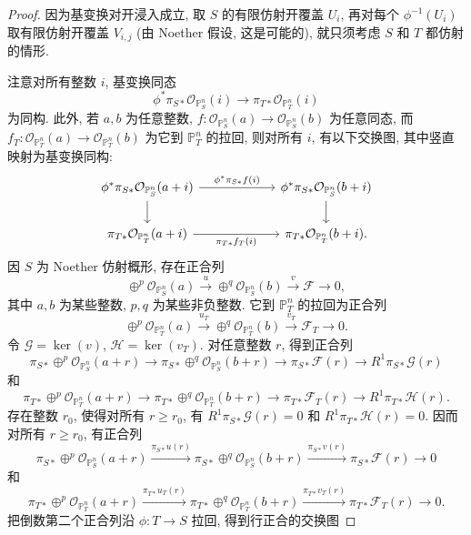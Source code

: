 \begin{proof}
因为基变换对开浸入成立, 取 $S$ 的有限仿射开覆盖 $U_i$, 再对每个 $\phi^{-1}(U_i)$ 取有限仿射开覆盖 $V_{i,j}$ (由 Noether 假设, 这是可能的), 就只须考虑 $S$ 和 $T$ 都仿射的情形.

注意对所有整数 $i$, 基变换同态
\[
 \phi^*\pi_{S*}\mathcal O_{\mathbb P^n_S}(i)\longrightarrow\pi_{T*}\mathcal O_{\mathbb P^n_T}(i)
\]
为同构. 此外, 若 $a,b$ 为任意整数, $f:\mathcal O_{\mathbb P^n_S}(a)\to\mathcal O_{\mathbb P^n_S}(b)$ 为任意同态, 而 $f_T:\mathcal O_{\mathbb P^n_T}(a)\to\mathcal O_{\mathbb P^n_T}(b)$ 为它到 $\mathbb P^n_T$ 的拉回, 则对所有 $i$, 有以下交换图, 其中竖直映射为基变换同构:
\[
\begin{tikzcd}[column sep=6em]
\phi^*\pi_{S*}\mathcal O_{\mathbb P^n_S}(a+i)\arrow[r,"\phi^*\pi_{S*}f(i)"]\arrow[d]
 &\phi^*\pi_{S*}\mathcal O_{\mathbb P^n_S}(b+i)\arrow[d]\\
\pi_{T*}\mathcal O_{\mathbb P^n_T}(a+i)\arrow[r,"\pi_{T*}f_T(i)"']
 &\pi_{T*}\mathcal O_{\mathbb P^n_T}(b+i).
\end{tikzcd}
\]
因 $S$ 为 Noether 仿射概形, 存在正合列
\[
 \oplus^p\mathcal O_{\mathbb P^n_S}(a)\xrightarrow{u}
 \oplus^q\mathcal O_{\mathbb P^n_S}(b)\xrightarrow{v}\mathcal F\longrightarrow0,
\]
其中 $a,b$ 为某些整数, $p,q$ 为某些非负整数. 它到 $\mathbb P^n_T$ 的拉回为正合列
\[
 \oplus^p\mathcal O_{\mathbb P^n_T}(a)\xrightarrow{u_T}
 \oplus^q\mathcal O_{\mathbb P^n_T}(b)\xrightarrow{v_T}\mathcal F_T\longrightarrow0.
\]
令 $\mathcal G=\ker(v)$, $\mathcal H=\ker(v_T)$. 对任意整数 $r$, 得到正合列
\[
 \pi_{S*}\oplus^p\mathcal O_{\mathbb P^n_S}(a+r)\longrightarrow
 \pi_{S*}\oplus^q\mathcal O_{\mathbb P^n_S}(b+r)\longrightarrow
 \pi_{S*}\mathcal F(r)\longrightarrow R^1\pi_{S*}\mathcal G(r)
\]
和
\[
 \pi_{T*}\oplus^p\mathcal O_{\mathbb P^n_T}(a+r)\longrightarrow
 \pi_{T*}\oplus^q\mathcal O_{\mathbb P^n_T}(b+r)\longrightarrow
 \pi_{T*}\mathcal F_T(r)\longrightarrow R^1\pi_{T*}\mathcal H(r).
\]
存在整数 $r_0$, 使得对所有 $r\geq r_0$, 有 $R^1\pi_{S*}\mathcal G(r)=0$ 和 $R^1\pi_{T*}\mathcal H(r)=0$. 因而对所有 $r\geq r_0$, 有正合列
\[
 \pi_{S*}\oplus^p\mathcal O_{\mathbb P^n_S}(a+r)\xrightarrow{\pi_{S*}u(r)}
 \pi_{S*}\oplus^q\mathcal O_{\mathbb P^n_S}(b+r)\xrightarrow{\pi_{S*}v(r)}
 \pi_{S*}\mathcal F(r)\longrightarrow0
\]
和
\[
 \pi_{T*}\oplus^p\mathcal O_{\mathbb P^n_T}(a+r)\xrightarrow{\pi_{T*}u_T(r)}
 \pi_{T*}\oplus^q\mathcal O_{\mathbb P^n_T}(b+r)\xrightarrow{\pi_{T*}v_T(r)}
 \pi_{T*}\mathcal F_T(r)\longrightarrow0.
\]
把倒数第二个正合列沿 $\phi:T\to S$ 拉回, 得到行正合的交换图

\end{proof}
